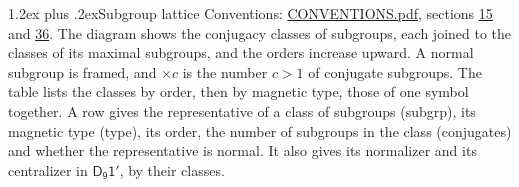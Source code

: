 \documentclass[10pt,a4paper]{article}
\makeatletter
\renewcommand\section{\@startsection{section}{1}{\z@}{-3ex plus -1ex minus -.2ex}%
  {1.2ex plus .2ex}{\normalfont\large\sffamily\bfseries\color{parttitle}}}
\numberwithin{equation}{section}
\newcommand{\grp}[1]{\mathsf{#1}}
\makeatother
\begin{document}
\section{Subgroup lattice}\label{s:subgroups}
Conventions: \href{../../CONVENTIONS.pdf}{CONVENTIONS.pdf}, sections \href{../../../rotation/CONVENTIONS.pdf\#conv.15}{15} and \href{../../CONVENTIONS.pdf\#conv.36}{36}.
The diagram shows the conjugacy classes of subgroups, each joined to the classes of its maximal subgroups, and the orders increase upward. \label{n:index.conjugates.c}\label{n:mark.conjugates}A normal subgroup is framed, and ${\times}c$ is the number $c > 1$ of conjugate subgroups. The table lists the classes by order, then by magnetic type, those of one symbol together. \label{n:head.subgroup}\label{n:head.magnetic.type}\label{n:head.order}\label{n:head.conjugates}\label{n:head.normal}A row gives the representative of a class of subgroups (subgrp), its magnetic type (type), its order, the number of subgroups in the class (conjugates) and whether the representative is normal. \label{n:head.normalizer}\label{n:head.centralizer}It also gives its normalizer and its centralizer in $\grp{D_{9}1'}$, by their classes. 
\end{document}
